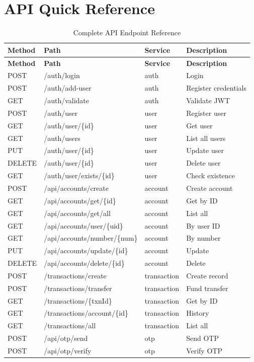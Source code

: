 \documentclass[12pt,a4paper]{report}
\begin{document}
\chapter{API Quick Reference}

\begin{longtable}{llll}
\caption{Complete API Endpoint Reference} \\
\toprule
\textbf{Method} & \textbf{Path} & \textbf{Service} & \textbf{Description} \\
\midrule
\endfirsthead
\toprule
\textbf{Method} & \textbf{Path} & \textbf{Service} & \textbf{Description} \\
\midrule
\endhead
\bottomrule
\endfoot

POST & /auth/login & auth & Login \\
POST & /auth/add-user & auth & Register credentials \\
GET & /auth/validate & auth & Validate JWT \\
\midrule
POST & /auth/user & user & Register user \\
GET & /auth/user/\{id\} & user & Get user \\
GET & /auth/users & user & List all users \\
PUT & /auth/user/\{id\} & user & Update user \\
DELETE & /auth/user/\{id\} & user & Delete user \\
GET & /auth/user/exists/\{id\} & user & Check existence \\
\midrule
POST & /api/accounts/create & account & Create account \\
GET & /api/accounts/get/\{id\} & account & Get by ID \\
GET & /api/accounts/get/all & account & List all \\
GET & /api/accounts/user/\{uid\} & account & By user ID \\
GET & /api/accounts/number/\{num\} & account & By number \\
PUT & /api/accounts/update/\{id\} & account & Update \\
DELETE & /api/accounts/delete/\{id\} & account & Delete \\
\midrule
POST & /transactions/create & transaction & Create record \\
POST & /transactions/transfer & transaction & Fund transfer \\
GET & /transactions/\{txnId\} & transaction & Get by ID \\
GET & /transactions/account/\{id\} & transaction & History \\
GET & /transactions/all & transaction & List all \\
\midrule
POST & /api/otp/send & otp & Send OTP \\
POST & /api/otp/verify & otp & Verify OTP \\

\end{longtable}
\end{document}
